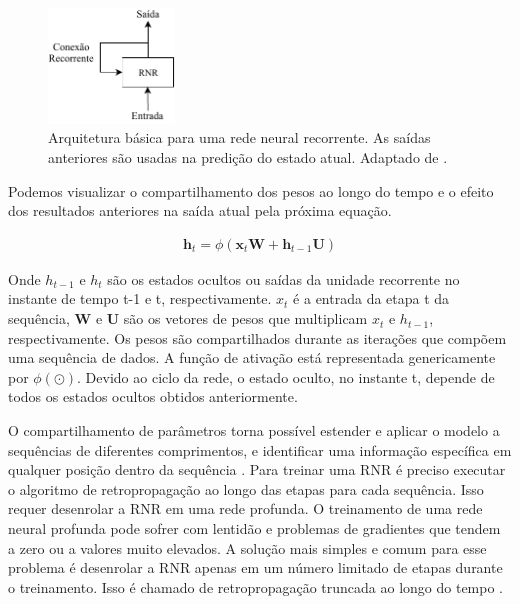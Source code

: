 \begin{figure}[h]
	\centering
	\includegraphics[width=0.3\textwidth]{figuras/rnn.pdf}
	\caption[Arquitetura RNR.]{Arquitetura básica para uma rede neural recorrente. As saídas anteriores são usadas na predição do estado atual. Adaptado de \cite{FrancoisDeepLearning}.}
	\label{fig:rnr}
\end{figure}

Podemos visualizar o compartilhamento dos pesos ao longo do tempo e o efeito dos resultados anteriores na saída atual pela próxima equação. 

\begin{equation}
\label{eq:memoria}
\begin{aligned}
\textbf{h}_{t} =  \phi( \textbf{x}_{t} \textbf{W} + \textbf{h}_{t-1} \textbf{U}) 
\end{aligned}
\end{equation}

Onde  $h_{t-1}$ e $h_{t}$ são os estados ocultos ou saídas da unidade recorrente no instante de tempo t-1 e t, respectivamente.  $x_{t}$ é a entrada da etapa  t da sequência, $\textbf{W}$ e $\textbf{U}$ são os vetores de pesos que multiplicam $x_{t}$ e $h_{t-1}$, respectivamente. Os pesos são compartilhados durante as iterações que compõem uma sequência de dados. A função de ativação está representada genericamente por $\phi \left( \odot \right)$. Devido ao ciclo da rede, o estado oculto, no instante t, depende de todos os estados ocultos obtidos anteriormente.  

O compartilhamento de parâmetros torna possível estender e aplicar o modelo a sequências de diferentes comprimentos, e identificar uma informação específica em qualquer posição dentro da sequência \cite{Goodfellow2016}. 
Para treinar uma RNR é preciso executar o algoritmo de retropropagação ao longo das etapas para cada sequência. Isso requer desenrolar a RNR em uma rede profunda. O treinamento de uma rede neural profunda pode sofrer com lentidão e problemas de gradientes que tendem a zero ou a valores muito elevados. A solução mais simples e comum para esse problema é desenrolar a RNR apenas em um número limitado de etapas durante o treinamento. Isso é chamado de retropropagação truncada ao longo do tempo \cite{geron2017hands}.

